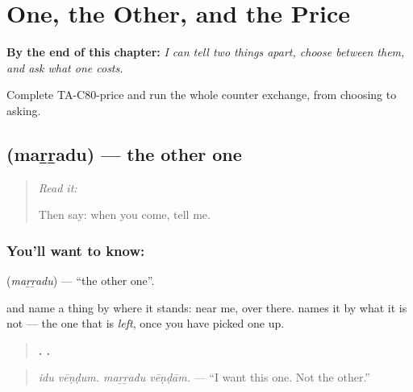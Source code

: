 
\chapter{One, the Other, and the Price}
\label{ch:ta-one-the-other-and-the-price}

\begin{chapteropening}
\textbf{By the end of this chapter:} \emph{I can tell two things apart, choose between them, and ask what one costs.}

Complete TA-C80-price and run the whole counter exchange, from choosing to asking.
\end{chapteropening}

\section[\texorpdfstring{\ta{மற்றது} (maṟṟadu)}{மற்றது (maṟṟadu)}]{ (maṟṟadu) — the other one}

\label{lesson:TA-C80-other}



\begin{quote}
\emph{Read it:} \textbf{}

Then say: when you come, tell me.
\end{quote}

\subsection*{You'll want to know: }
\textbf{} (\emph{maṟṟadu}) — \textquotedblleft{}the other one\textquotedblright{}.

 and  name a thing by where it stands: near me, over there.  names it by what it is not — the one that is \emph{left}, once you have picked one up.

\begin{quote}
\textbf{ .  .}
\end{quote}

\begin{quote}
\emph{idu vēṇḍum. maṟṟadu vēṇḍām.} — \textquotedblleft{}I want this one. Not the other.\textquotedblright{}
\end{quote}

